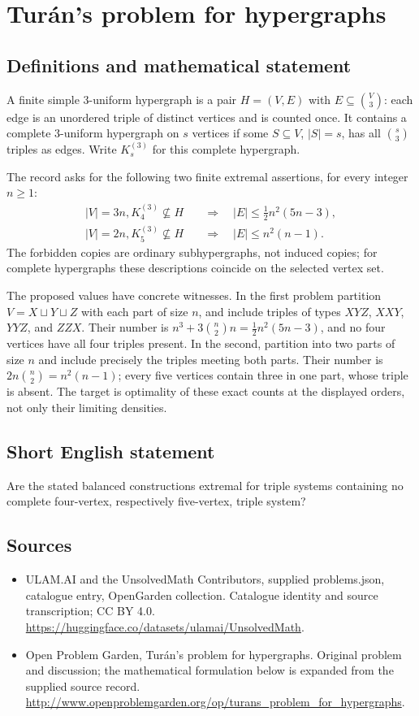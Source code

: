 \documentclass[11pt,a4paper]{article}
\begin{document}
\section*{Turán's problem for hypergraphs}\label{statement}

\subsection{Definitions and mathematical statement}
A finite simple 3-uniform hypergraph is a pair $H=(V,E)$ with
$E\subseteq\binom V3$: each edge is an unordered triple of distinct
vertices and is counted once. It contains a complete 3-uniform
hypergraph on $s$ vertices if some $S\subseteq V$, $|S|=s$, has all
$\binom s3$ triples as edges. Write $K_s^{(3)}$ for this complete
hypergraph.

The record asks for the following two finite extremal assertions,
for every integer $n\ge1$:
\[
 \begin{aligned}
 |V|=3n, K_4^{(3)}\not\subseteq H
      &\quad\Longrightarrow\quad |E|\le\tfrac12n^2(5n-3),\\
 |V|=2n, K_5^{(3)}\not\subseteq H
      &\quad\Longrightarrow\quad |E|\le n^2(n-1).
 \end{aligned}
\]
The forbidden copies are ordinary subhypergraphs, not induced copies;
for complete hypergraphs these descriptions coincide on the selected
vertex set.

The proposed values have concrete witnesses. In the first problem
partition $V=X\sqcup Y\sqcup Z$ with each part of size $n$, and include
triples of types $XYZ$, $XXY$, $YYZ$, and $ZZX$. Their number is
$n^3+3\binom n2n=\tfrac12n^2(5n-3)$, and no four vertices have all four
triples present. In the second, partition into two parts of size $n$
and include precisely the triples meeting both parts. Their number
is $2n\binom n2=n^2(n-1)$; every five vertices contain three in one
part, whose triple is absent. The target is optimality of these exact
counts at the displayed orders, not only their limiting densities.
\subsection{Short English statement}
Are the stated balanced constructions extremal for triple systems containing no complete four-vertex, respectively five-vertex, triple system?
\subsection{Sources}
\begin{itemize}
\item[S1] ULAM.AI and the UnsolvedMath Contributors, supplied problems.json, catalogue entry, OpenGarden collection. Catalogue identity and source transcription; CC BY 4.0.
\url{https://huggingface.co/datasets/ulamai/UnsolvedMath}.
\item[S2] Open Problem Garden, Turán's problem for hypergraphs. Original problem and discussion; the mathematical formulation below is expanded from the supplied source record.
\url{http://www.openproblemgarden.org/op/turans_problem_for_hypergraphs}.
\end{itemize}
\end{document}
